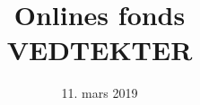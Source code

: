 \documentclass{vedtekter}
\title{\Large{}Onlines fonds\\\Huge{VEDTEKTER}}
\date{
11. mars 2019  %
\dobbelSignatur{Christoffer Lofsberg}{Adrian Thompson}  %
}
\begin{document}
\maketitle
\small{}
\tableofcontents
\newpage
\normalsize{}










\end{document}
